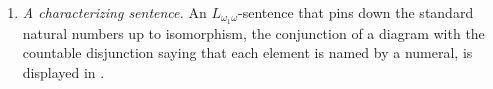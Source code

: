 \begin{enumerate}
      classes, each defined by an \(L_{\omega_1\omega}\)-sentence
      \cite[ch.~A.7, \S8, Theorem~8.11 and the remark after it,
      p.~276]{Makkai1977}.  The in-book proofs listed in
      \cref{tab:p02-w02-p02-039-treatments} follow the approximant route
      of \cref{thm:p03-morley-scott-sentence} and the potential-isomorphism
      route of \cref{thm:p08-bvb501-potential-isomorphism}, not this
      descriptive-set-theoretic route.
\item \emph{A characterizing sentence.}  An \(L_{\omega_1\omega}\)-sentence
      that pins down the standard natural numbers up to isomorphism, the
      conjunction of a diagram with the countable disjunction saying that
      each element is named by a numeral, is displayed in
      \cite[ch.~A.7, \S5, p.~254]{Makkai1977}.
\end{enumerate}
